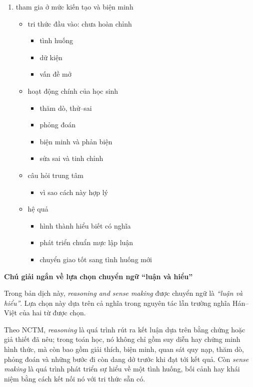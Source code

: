 \documentclass[
  10pt,
  a4paper,
  landscape,
  twoside,
  openany
]{scrbook}
\begin{document}
{{\begin{enumerate}
  \item tham gia ở mức kiến tạo và biện minh
    \begin{itemize}
      \item tri thức đầu vào: chưa hoàn chỉnh
        \begin{itemize}
          \item tình huống
          \item dữ kiện
          \item vấn đề mở
        \end{itemize}
      \item hoạt động chính của học sinh
        \begin{itemize}
          \item thăm dò, thử--sai
          \item phỏng đoán
          \item biện minh và phản biện
          \item sửa sai và tinh chỉnh
        \end{itemize}
      \item câu hỏi trung tâm
        \begin{itemize}
          \item vì sao cách này hợp lý
        \end{itemize}
      \item hệ quả
        \begin{itemize}
          \item hình thành hiểu biết có nghĩa
          \item phát triển chuẩn mực lập luận
          \item chuyển giao tốt sang tình huống mới
        \end{itemize}
    \end{itemize}
\end{enumerate}

\noindent
\textbf{Chú giải ngắn về lựa chọn chuyển ngữ ``luận và hiểu''}

Trong bản dịch này, \emph{reasoning and sense making} được chuyển ngữ là \emph{``luận và hiểu''}. Lựa chọn này dựa trên cả nghĩa trong nguyên tác lẫn trường nghĩa Hán--Việt của hai từ được chọn.

Theo NCTM, \emph{reasoning} là quá trình rút ra kết luận dựa trên bằng chứng hoặc giả thiết đã nêu; trong toán học, nó không chỉ gồm suy diễn hay chứng minh hình thức, mà còn bao gồm giải thích, biện minh, quan sát quy nạp, thăm dò, phỏng đoán và những bước đi còn dang dở trước khi đạt tới kết quả. Còn \emph{sense making} là quá trình phát triển sự hiểu về một tình huống, bối cảnh hay khái niệm bằng cách kết nối nó với tri thức sẵn có.

}}
\end{document}
